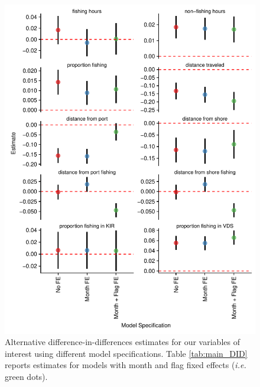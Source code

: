 \documentclass[9pttwoside,lineno]{pnas-new}
\begin{document}
\begin{figure}
\centering
\includegraphics{img/other_specifications.pdf}
\caption{\label{fig:other_specifications}Alternative difference-in-differences estimates
for our variables of interest using different model specifications. Table \ref{tab:main_DID}
reports estimates for models with month and flag fixed effects (\emph{i.e.} green dots).}
\end{figure}
\end{document}
